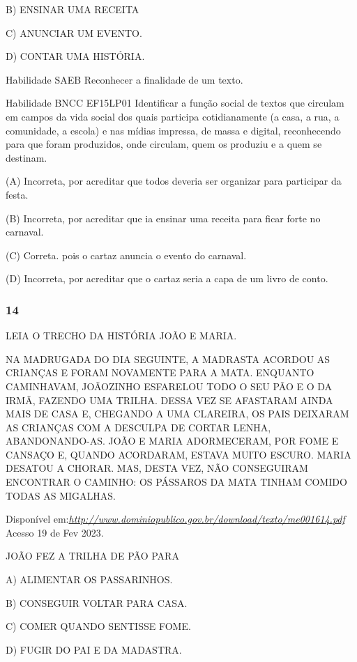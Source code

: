 \begin{escola}
B) ENSINAR UMA RECEITA

C) ANUNCIAR UM EVENTO.

D) CONTAR UMA HISTÓRIA.

Habilidade SAEB Reconhecer a finalidade de um texto.

Habilidade BNCC EF15LP01 Identificar a função social de textos que
circulam em campos da vida social dos quais participa cotidianamente (a
casa, a rua, a comunidade, a escola) e nas mídias impressa, de massa e
digital, reconhecendo para que foram produzidos, onde circulam, quem os
produziu e a quem se destinam.

(A) Incorreta, por acreditar que todos deveria ser organizar para
participar da festa.

(B) Incorreta, por acreditar que ia ensinar uma receita para ficar
forte no carnaval.

(C) Correta. pois o cartaz anuncia o evento do carnaval.

(D) Incorreta, por acreditar que o cartaz seria a capa de um livro de
conto.\protect\hypertarget{_heading=h.gluii2ldfhnb}{}{}

\subsubsection{14}\label{section-39}

LEIA O TRECHO DA HISTÓRIA JOÃO E MARIA.

NA MADRUGADA DO DIA SEGUINTE, A MADRASTA ACORDOU AS CRIANÇAS E FORAM
NOVAMENTE PARA A MATA. ENQUANTO CAMINHAVAM, JOÃOZINHO ESFARELOU TODO O
SEU PÃO E O DA IRMÃ, FAZENDO UMA TRILHA. DESSA VEZ SE AFASTARAM AINDA
MAIS DE CASA E, CHEGANDO A UMA CLAREIRA, OS PAIS DEIXARAM AS CRIANÇAS
COM A DESCULPA DE CORTAR LENHA, ABANDONANDO-AS. JOÃO E MARIA
ADORMECERAM, POR FOME E CANSAÇO E, QUANDO ACORDARAM, ESTAVA MUITO
ESCURO. MARIA DESATOU A CHORAR. MAS, DESTA VEZ, NÃO CONSEGUIRAM
ENCONTRAR O CAMINHO: OS PÁSSAROS DA MATA TINHAM COMIDO TODAS AS
MIGALHAS.

Disponível
em:\href{http://www.dominiopublico.gov.br/download/texto/me001614.pdf}{\emph{http://www.dominiopublico.gov.br/download/texto/me001614.pdf}}
Acesso 19 de Fev 2023.

JOÃO FEZ A TRILHA DE PÃO PARA

A) ALIMENTAR OS PASSARINHOS.

B) CONSEGUIR VOLTAR PARA CASA.

C) COMER QUANDO SENTISSE FOME.

D) FUGIR DO PAI E DA MADASTRA.


\end{escola}
